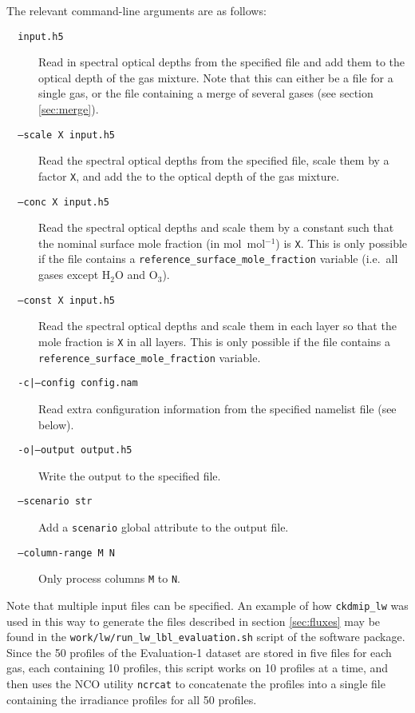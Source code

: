 \documentclass[twoside]{article}
\def\codesize{\small}
\def\code#1{{\codesize\texttt{#1}}}
\def\citem#1{\item[{\codesize\texttt{#1}}]}
\begin{document}
The relevant command-line arguments are as follows:
%
\begin{description}
\citem{~~input.h5} Read in spectral optical depths from the specified
file and add them to the optical depth of the gas mixture. Note that
this can either be a file for a single gas, or the file containing a
merge of several gases (see section \ref{sec:merge}).
%
\citem{~~--scale X input.h5} Read the spectral optical depths from the
specified file, scale them by a factor \code{X}, and add the to the
optical depth of the gas mixture.
%
\citem{~~--conc X input.h5} Read the spectral optical depths and scale
them by a constant such that the nominal surface mole fraction (in
mol~mol$^{-1}$) is \code{X}. This is only possible if the file
contains a \code{reference\_surface\_mole\_fraction} variable
(i.e.\ all gases except H$_2$O and O$_3$).
%
\citem{~~--const X input.h5} Read the spectral optical depths and
scale them in each layer so that the mole fraction is \code{X} in all
layers. This is only possible if the file contains a
\code{reference\_surface\_mole\_fraction} variable.
%
\citem{~~-c|--config config.nam} Read extra configuration information
from the specified namelist file (see below).
%
\citem{~~-o|--output output.h5} Write the output to the specified file.
%
\citem{~~--scenario str} Add a \code{scenario} global attribute to the
output file.
%
\citem{~~--column-range M N} Only process columns \code{M}
to \code{N}.
%
\end{description}
%
Note that multiple input files can be specified. An example of how
\code{ckdmip\_lw} was used in this way to generate the files described
in section \ref{sec:fluxes} may be found in the
\code{work/lw/run\_lw\_lbl\_evaluation.sh} script of the software
package. Since the 50 profiles of the Evaluation-1 dataset are stored
in five files for each gas, each containing 10 profiles, this script
works on 10 profiles at a time, and then uses the NCO utility
\code{ncrcat} to concatenate the profiles into a single file
containing the irradiance profiles for all 50 profiles.
\end{document}
